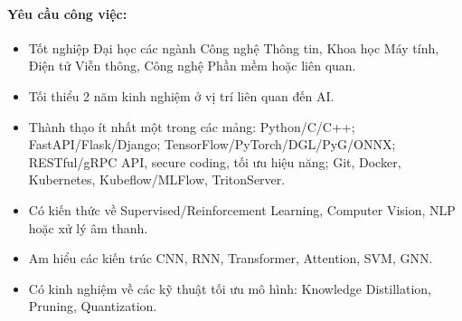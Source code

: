 \paragraph{Yêu cầu công việc:}
\begin{itemize}
    \item Tốt nghiệp Đại học các ngành Công nghệ Thông tin, Khoa học Máy tính, Điện tử Viễn thông, Công nghệ Phần mềm hoặc liên quan.
    \item Tối thiểu 2 năm kinh nghiệm ở vị trí liên quan đến AI.
    \item Thành thạo ít nhất một trong các mảng: Python/C/C++; FastAPI/Flask/Django; TensorFlow/PyTorch/DGL/PyG/ONNX; RESTful/gRPC API, secure coding, tối ưu hiệu năng; Git, Docker, Kubernetes, Kubeflow/MLFlow, TritonServer.
    \item Có kiến thức về Supervised/Reinforcement Learning, Computer Vision, NLP hoặc xử lý âm thanh.
    \item Am hiểu các kiến trúc CNN, RNN, Transformer, Attention, SVM, GNN.
    \item Có kinh nghiệm về các kỹ thuật tối ưu mô hình: Knowledge Distillation, Pruning, Quantization.
\end{itemize}
